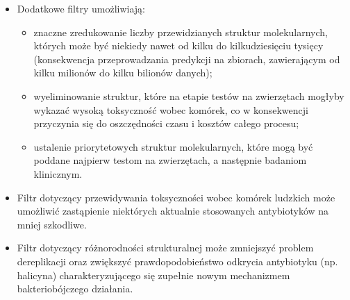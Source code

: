 \begin{enumerate}
    \begin{itemize}
        \item Dodatkowe filtry umożliwiają:        
        \begin{itemize}
            \item znaczne zredukowanie liczby przewidzianych struktur molekularnych, których może być niekiedy nawet od kilku do kilkudziesięciu tysięcy (konsekwencja przeprowadzania predykcji na zbiorach, zawierającym od kilku milionów do kilku bilionów danych);
            \item wyeliminowanie struktur, które na etapie testów na zwierzętach mogłyby wykazać wysoką toksyczność wobec komórek, co w konsekwencji przyczynia się do oszczędności czasu i kosztów całego procesu;
            \item ustalenie priorytetowych struktur molekularnych, które mogą być poddane najpierw testom na zwierzętach, a następnie badaniom klinicznym.
        \end{itemize}
        \item Filtr dotyczący przewidywania toksyczności wobec komórek ludzkich może umożliwić zastąpienie niektórych aktualnie stosowanych antybiotyków na mniej szkodliwe.
        \item Filtr dotyczący różnorodności strukturalnej może zmniejszyć problem dereplikacji oraz zwiększyć prawdopodobieństwo odkrycia antybiotyku (np. halicyna) charakteryzującego się zupełnie nowym mechanizmem bakteriobójczego działania.
    \end{itemize}
\end{enumerate}
